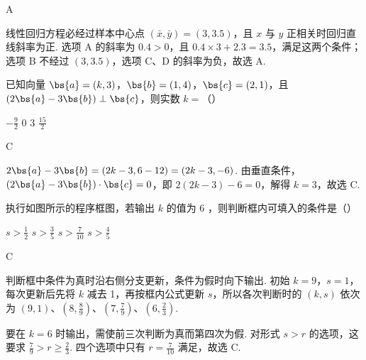 \begin{answer}
A
\end{answer}

\begin{solution}
线性回归方程必经过样本中心点 \((\bar{x},\bar{y})=(3,3.5)\)，且 \(x\) 与 \(y\) 正相关时回归直线斜率为正. 选项 A 的斜率为 \(0.4>0\)，且 \(0.4\times3+2.3=3.5\)，满足这两个条件；选项 B 不经过 \((3,3.5)\)，选项 C、D 的斜率为负，故选 A.
\end{solution}

\begin{problem}
已知向量 \(\bs{a} = (k, 3)\)，\(\bs{b} = (1, 4)\)，\(\bs{c} = (2, 1)\)，且 \((2\bs{a} - 3\bs{b}) \perp \bs{c}\)，则实数 \(k =\)（\quad）

\choices
    {\(-\frac{9}{2}\)}
    {0}
    {3}
    {\(\frac{15}{2}\)}
\end{problem}

\begin{answer}
C
\end{answer}

\begin{solution}
\(2\bs{a}-3\bs{b}=(2k-3,6-12)=(2k-3,-6)\). 由垂直条件，
\((2\bs{a}-3\bs{b})\cdot\bs{c}=0\)，即
\(2(2k-3)-6=0\)，解得 \(k=3\)，故选 C.
\end{solution}

\begin{problem}
执行如图所示的程序框图，若输出 \(k\) 的值为 6 ，则判断框内可填入的条件是（\quad）


\choices
    {\(s > \frac{1}{2}\)}
    {\(s > \frac{3}{5}\)}
    {\(s > \frac{7}{10}\)}
    {\(s > \frac{4}{5}\)}
\end{problem}

\begin{answer}
C
\end{answer}

\begin{solution}
判断框中条件为真时沿右侧分支更新，条件为假时向下输出. 初始 \(k=9\)，\(s=1\)，每次更新后先将 \(k\) 减去 1，再按框内公式更新 \(s\)，所以各次判断时的 \((k,s)\) 依次为
\((9,1)\)、\(\left(8,\frac{8}{9}\right)\)、\(\left(7,\frac{7}{9}\right)\)、\(\left(6,\frac{2}{3}\right)\).

要在 \(k=6\) 时输出，需使前三次判断为真而第四次为假. 对形式 \(s>r\) 的选项，这要求
\(\frac{7}{9}>r\geqslant\frac{2}{3}\). 四个选项中只有 \(r=\frac{7}{10}\) 满足，故选 C.
\end{solution}

